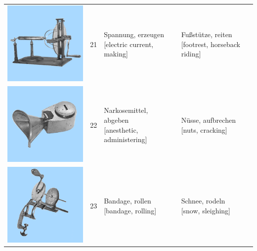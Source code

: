 \documentclass[
  english,
  doc,12pt,twoside,floatsintext]{apa7}
\begin{document}
\begin{center}
\begin{ThreePartTable}
{\begin{longtable}{llll}
\includegraphics[valign=c, scale=0.23]{../materials/unfamiliar/21.png} & 21 & \makecell[l]{Spannung, erzeugen\\{[electric current, making]}} & \makecell[l]{Fußstütze, reiten\\{[footrest, horseback riding]}}\\
\includegraphics[valign=c, scale=0.23]{../materials/unfamiliar/22.png} & 22 & \makecell[l]{Narkosemittel, abgeben\\{[anesthetic, administering]}} & \makecell[l]{Nüsse, aufbrechen\\{[nuts, cracking]}}\\
\includegraphics[valign=c, scale=0.23]{../materials/unfamiliar/23.png} & 23 & \makecell[l]{Bandage, rollen\\{[bandage, rolling]}} & \makecell[l]{Schnee, rodeln\\{[snow, sleighing]}}\\

\end{longtable}}
\end{ThreePartTable}
\end{center}
\end{document}
